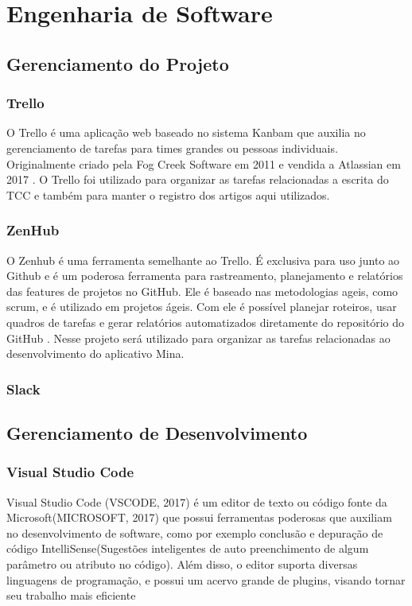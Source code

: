 \section{Engenharia de Software}

\subsection{Gerenciamento do Projeto}

\subsubsection{Trello}


O Trello é uma aplicação web baseado no sistema Kanbam que auxilia no gerenciamento de tarefas para times grandes ou pessoas individuais. Originalmente criado pela Fog Creek Software em 2011 e vendida a Atlassian em 2017 \cite{trello2011}. O Trello foi utilizado para organizar as tarefas relacionadas a escrita do TCC e também para manter o registro dos artigos aqui utilizados.

\subsubsection{ZenHub}
O Zenhub é uma ferramenta semelhante ao Trello. É exclusiva para uso junto ao Github e é um poderosa ferramenta para rastreamento, planejamento e relatórios das features de projetos no GitHub. Ele é baseado nas metodologias ageis, como scrum, e é utilizado em projetos ágeis. Com ele é possível planejar roteiros, usar quadros de tarefas e gerar relatórios automatizados diretamente do repositório do GitHub \cite{zenhub2020}. Nesse projeto será utilizado para organizar as tarefas relacionadas ao desenvolvimento do aplicativo Mina.


\subsubsection{Slack}

\subsection{Gerenciamento de Desenvolvimento}

\subsubsection{Visual Studio Code}

Visual Studio Code (VSCODE, 2017) é um editor de texto ou código fonte da Microsoft(MICROSOFT, 2017) que possui ferramentas poderosas que auxiliam no desenvolvimento de software, como por exemplo conclusão e depuração de código IntelliSense(Sugestões inteligentes de auto preenchimento de algum parâmetro ou atributo no código). Além disso, o editor suporta diversas linguagens de programação, e possui um acervo grande de plugins, visando tornar seu trabalho mais eficiente

